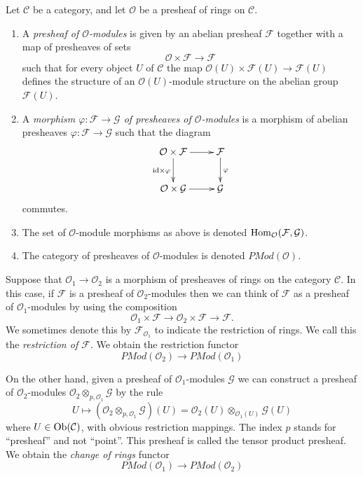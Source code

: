 \begin{definition}
\label{definition-presheaf-modules}
Let $\mathcal{C}$ be a category, and
let $\mathcal{O}$ be a presheaf of rings on $\mathcal{C}$.
\begin{enumerate}
\item A {\it presheaf of $\mathcal{O}$-modules}
is given by an abelian presheaf $\mathcal{F}$ together with a
map of presheaves of sets
$$
\mathcal{O} \times \mathcal{F} \longrightarrow \mathcal{F}
$$
such that for every object $U$ of $\mathcal{C}$ the map
$\mathcal{O}(U) \times \mathcal{F}(U) \to \mathcal{F}(U)$
defines the structure of an $\mathcal{O}(U)$-module
structure on the abelian group $\mathcal{F}(U)$.
\item A {\it morphism $\varphi : \mathcal{F} \to \mathcal{G}$
of presheaves of $\mathcal{O}$-modules} is a morphism of abelian presheaves
$\varphi : \mathcal{F} \to \mathcal{G}$ such that
the diagram
$$
\xymatrix{
\mathcal{O} \times \mathcal{F} \ar[r] \ar[d]_{\text{id} \times \varphi} &
\mathcal{F} \ar[d]^{\varphi} \\
\mathcal{O} \times \mathcal{G} \ar[r] &
\mathcal{G}
}
$$
commutes.
\item The set of $\mathcal{O}$-module morphisms as above is
denoted $\mathop{\mathrm{Hom}}\nolimits_\mathcal{O}(\mathcal{F}, \mathcal{G})$.
\item The category of presheaves of $\mathcal{O}$-modules is denoted
$\textit{PMod}(\mathcal{O})$.
\end{enumerate}
\end{definition}

\noindent
Suppose that $\mathcal{O}_1 \to \mathcal{O}_2$ is a
morphism of presheaves of rings on the category $\mathcal{C}$. In this case,
if $\mathcal{F}$ is a presheaf of $\mathcal{O}_2$-modules
then we can think of $\mathcal{F}$ as a presheaf of
$\mathcal{O}_1$-modules by using the composition
$$
\mathcal{O}_1 \times \mathcal{F}
\to
\mathcal{O}_2 \times \mathcal{F}
\to
\mathcal{F}.
$$
We sometimes denote this by $\mathcal{F}_{\mathcal{O}_1}$
to indicate the restriction of rings. We call this
the {\it restriction of $\mathcal{F}$}. We obtain the
restriction functor
$$
\textit{PMod}(\mathcal{O}_2)
\longrightarrow
\textit{PMod}(\mathcal{O}_1)
$$

\medskip\noindent
On the other hand, given a presheaf of $\mathcal{O}_1$-modules
$\mathcal{G}$
we can construct a presheaf of $\mathcal{O}_2$-modules
$\mathcal{O}_2 \otimes_{p, \mathcal{O}_1} \mathcal{G}$
by the rule
$$
U \longmapsto
\left(\mathcal{O}_2 \otimes_{p, \mathcal{O}_1} \mathcal{G}\right)(U)
=
\mathcal{O}_2(U) \otimes_{\mathcal{O}_1(U)} \mathcal{G}(U)
$$
where $U \in \mathop{\mathrm{Ob}}\nolimits(\mathcal{C})$, with obvious restriction mappings.
The index $p$ stands for ``presheaf'' and not ``point''.
This presheaf is called the tensor product presheaf. We obtain
the {\it change of rings} functor
$$
\textit{PMod}(\mathcal{O}_1)
\longrightarrow
\textit{PMod}(\mathcal{O}_2)
$$

